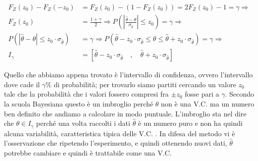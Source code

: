   \[ 
    \begin{split}
      F_Z(z_0)-F_Z(-z_0) & =F_Z(z_0)-(1-F_Z(z_0))=2F_Z(z_0)-1=\gamma \Rightarrow \\
      F_Z(z_0) & =\frac{1+\gamma}{2} \Rightarrow P\left(\left| \frac{\hat{\theta}-\theta}{\sigma_{\hat{\theta}}} \right| \leq z_0 \right)=\gamma \Rightarrow \\
      P\left(\left| {\hat{\theta}-\theta}\right|\leq z_0\cdot \sigma_{\hat{\theta}} \right) & =\gamma\Rightarrow P(\hat{\theta}-z_0\cdot\sigma_{\hat{\theta}}\leq\theta\leq\hat{\theta}+z_0 \cdot\sigma_{\hat{\theta}})=\gamma \Rightarrow \\
      I_\gamma & =\left[\hat{\theta}-z_0\cdot\sigma_{\hat{\theta}} \quad,\quad\hat{\theta}+z_0\cdot\sigma_{\hat{\theta}}\right]
    \end{split}
  \]
  
Quello che abbiamo appena trovato è l'intervallo di confidenza, ovvero l'intervallo dove cade il $\gamma\%$ di probabilità; per trovarlo siamo partiti cercando un valore $z_0$ tale che la probabilità che i valori fossero compresi fra $\pm z_0$ fosse pari a $\gamma$.\newline
Secondo la scuola Bayesiana questo è un imbroglio perché $\theta$ non è una V.C. ma un numero ben definito che andiamo a calcolare in modo puntuale. L'imbroglio sta nel dire che $\theta \in I_\gamma$ perché una volta raccolti i dati $\hat{\theta}$ è un numero puro e non ha quindi alcuna variabilità, caratteristica tipica delle V.C. . In difesa del metodo vi è l'osservazione che ripetendo l'esperimento, e quindi ottenendo nuovi dati, $\hat{\theta}$ potrebbe cambiare e quindi è trattabile come una V.C.

